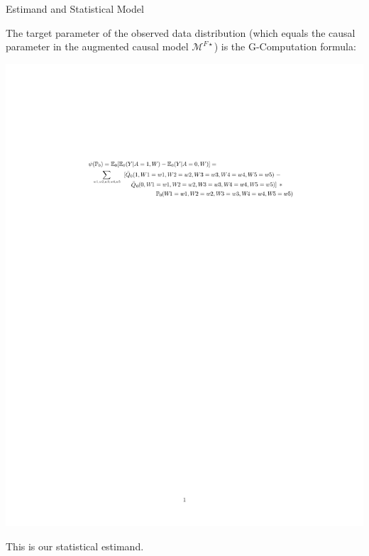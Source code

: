 \documentclass[ignorenonframetext,]{beamer}
\begin{document}
\begin{frame}{Estimand and Statistical Model}

The target parameter of the observed data distribution (which equals the
causal parameter in the augmented causal model \(\mathcal{M}^{F\star}\))
is the G-Computation formula:

\includegraphics[width=14.99in]{estimand}

This is our statistical estimand.

\end{frame}
\end{document}
